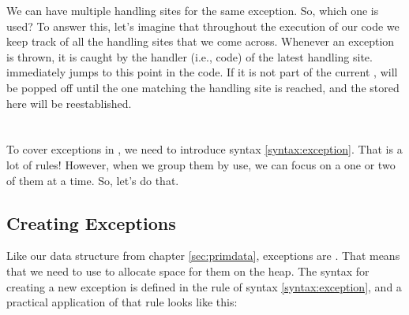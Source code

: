 We can have multiple handling sites for the same exception. So, which one is used? To answer this, let's imagine that throughout the execution of our code we keep track of all the handling sites that we come across. Whenever an exception is thrown, it is caught by the handler (i.e., code) of the latest handling site.  immediately jumps to this point in the code. If it is not part of the current ,  will be popped off until the one matching the handling site is reached, and the  stored here will be reestablished.

\section{\csharp}

To cover exceptions in \csharp, we need to introduce syntax \ref{syntax:exception}. That is a lot of rules! However, when we group them by use, we can focus on a one or two of them at a time. So, let's do that.

\begin{syntaxfloat}
  
  \caption{Exceptions.}
  \label{syntax:exception}
\end{syntaxfloat}

\subsection{Creating Exceptions}

Like our data structure from chapter \ref{sec:primdata}, exceptions are . That means that we need to use  to allocate space for them on the heap. The syntax for creating a new exception is defined in the  rule of syntax \ref{syntax:exception}, and a practical application of that rule looks like this:

